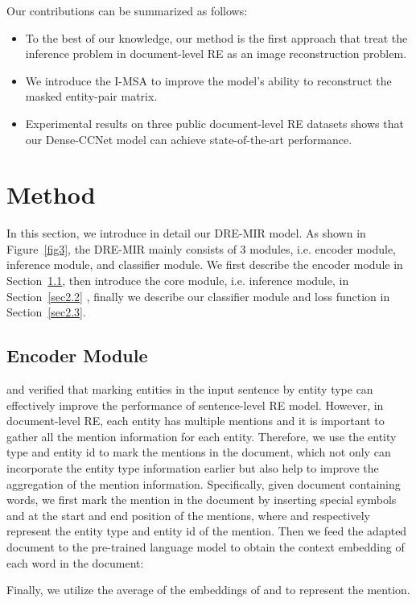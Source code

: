 \documentclass{article}
\begin{document}
Our contributions can be summarized as follows:
\begin{itemize}
\item To the best of our knowledge, our method is the first approach that treat the inference problem in document-level RE as an image reconstruction problem.
\item We introduce the I-MSA to improve the model's ability to reconstruct the masked entity-pair matrix.
\item Experimental results on three public document-level RE datasets shows that our Dense-CCNet model can achieve state-of-the-art performance.
\end{itemize}

\section{Method}
In this section, we introduce in detail our DRE-MIR model. 
As shown in Figure~\ref{fig3}, the DRE-MIR mainly consists of 3 modules, i.e. encoder
module, inference module, and classifier module.
We first describe the encoder module in Section~\ref{sec2.1}, then introduce the core module, i.e. inference module, in Section~\ref{sec2.2} , finally we describe our classifier module and loss function in Section~\ref{sec2.3}.

\subsection{Encoder Module}
\label{sec2.1}
\cite{c:20} and \cite{c:21} verified that marking entities in the input sentence by entity type can effectively improve the performance of sentence-level RE model.
However, in document-level RE, each entity has multiple mentions and it is important to gather all the mention information for each entity.
Therefore, we use the entity type and entity id to mark the mentions in the document, which not only can incorporate the entity type information earlier but also help to improve the aggregation of the mention information.
Specifically, given document  containing  words, we first mark the mention in the document by inserting special symbols  and  at the start and end position of the mentions, where  and  respectively represent the entity type and entity id of the mention.
Then we feed the adapted document to the pre-trained language model to obtain the context embedding of each word in the document:

Finally, we utilize the average of the embeddings of  and  to represent  the mention.
\end{document}
